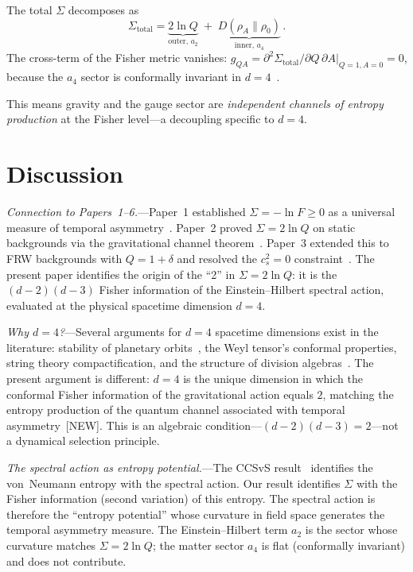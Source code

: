 \documentclass[prl,twocolumn,superscriptaddress,longbibliography]{revtex4-2}
\begin{document}
The total $\Sigma$ decomposes as
\begin{equation}\label{eq:Sigma_total}
  \Sigma_{\mathrm{total}}
  = \underbrace{2\ln Q}_{\text{outer, }a_2}
  \;+\;
  \underbrace{D(\rho_A \| \rho_0)}_{\text{inner, }a_4}\,.
\end{equation}
The cross-term of the Fisher metric
vanishes:
$g_{QA} = \partial^2 \Sigma_{\mathrm{total}}
/\partial Q\,\partial A |_{Q=1,A=0} = 0$,
because the $a_4$ sector is conformally
invariant in $d=4$~\cite{Wald1984}.

This means gravity and the gauge sector are
\emph{independent channels of entropy
production} at the Fisher level---a
decoupling specific to $d=4$.


\section{Discussion}
\label{sec:discussion}

\emph{Connection to Papers~1--6.}---Paper~1
established $\Sigma = -\ln F \geq 0$ as a
universal measure of temporal
asymmetry~\cite{PaperI}.
Paper~2 proved $\Sigma = 2\ln Q$ on static
backgrounds via the gravitational channel
theorem~\cite{PaperII}.
Paper~3 extended this to FRW backgrounds with
$Q = 1+\delta$ and resolved the
$c_s^2 = 0$ constraint~\cite{PaperIII}.
The present paper identifies the origin of the
``2'' in $\Sigma = 2\ln Q$: it is the
$(d-2)(d-3)$ Fisher information of the
Einstein--Hilbert spectral action, evaluated at
the physical spacetime dimension $d=4$.

\emph{Why $d=4$?}---Several arguments for
$d=4$ spacetime dimensions exist in the
literature: stability of planetary
orbits~\cite{Ehrenfest1917}, the Weyl
tensor's conformal properties, string theory
compactification, and the structure of division
algebras~\cite{BaezHuerta2010}.
The present argument is different: $d=4$ is
the unique dimension in which the conformal
Fisher information of the gravitational action
equals $2$, matching the entropy production
of the quantum channel associated with
temporal asymmetry~[NEW].
This is an algebraic condition---$(d-2)(d-3) = 2$---not
a dynamical selection principle.

\emph{The spectral action as entropy potential.}---The
CCSvS result~\cite{CCSvS2018} identifies the
von~Neumann entropy with the spectral action.
Our result identifies $\Sigma$ with the Fisher
information (second variation) of this entropy.
The spectral action is therefore the
``entropy potential'' whose curvature
in field space generates the temporal asymmetry
measure.
The Einstein--Hilbert term $a_2$ is the sector
whose curvature matches $\Sigma = 2\ln Q$;
the matter sector $a_4$ is flat (conformally
invariant) and does not contribute.
\end{document}
